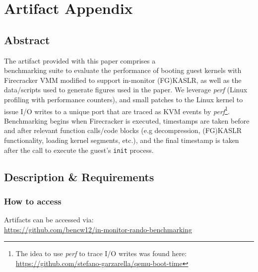 \documentclass[sigplan,twocolumn]{acmart}
\begin{document}
    

\appendix
\section{Artifact Appendix} 

\subsection{Abstract}

The artifact provided with this paper comprises a \\
benchmarking suite to evaluate the performance
of booting guest kernels with Firecracker VMM modified to support in-monitor (FG)KASLR, as well as the data/scripts
used to generate figures used in the paper.
We leverage \textit{perf} (Linux profiling with performance counters), and small patches to the 
Linux kernel to issue I/O writes to a unique port that are
traced as KVM events by \textit{perf}\footnote{The idea to use \textit{perf} to trace I/O writes was found here: \url{https://github.com/stefano-garzarella/qemu-boot-time}}.
Benchmarking begins when Firecracker is executed,
timestamps are taken before and after relevant function calls/code blocks
(e.g decompression, (FG)KASLR functionality, loading kernel segments, etc.),
and the final timestamp is taken after the call to execute the guest's \texttt{init} process.


\subsection{Description \& Requirements}


\subsubsection{How to access}
Artifacts can be accessed via:\\
 \url{https://github.com/bencw12/in-monitor-rando-benchmarking}
\end{document}
